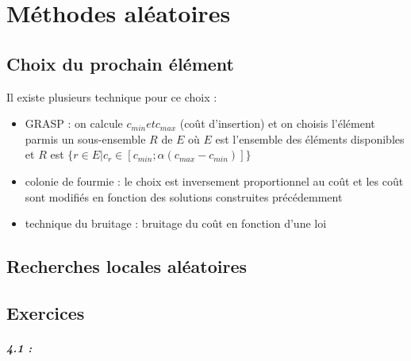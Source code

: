 \documentclass[11pt,a4paper]{report}
\begin{document}
\chapter{Méthodes aléatoires}

\section{Choix du prochain élément}

Il existe plusieurs technique pour ce choix :
\begin{itemize}
    \item GRASP : on calcule $c_{min} et c_{max}$ (coût d'insertion) et on choisis l'élément parmis un sous-ensemble $R$ de $E$ où $E$ est l'ensemble des éléments disponibles et $R$ est $\{r \in E | c_{r} \in [c_{min};\alpha(c_{max}-c_{min})]\}$
    \item colonie de fourmie : le choix est inversement proportionnel au coût et les coût sont modifiés en fonction des solutions construites précédemment
    \item technique du bruitage : bruitage du coût en fonction d'une loi
\end{itemize}

\section{Recherches locales aléatoires}

\section{Exercices}

\paragraph*{4.1 : }
\end{document}
